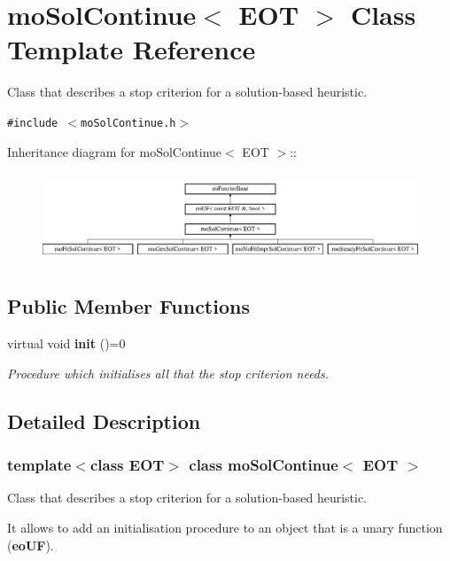 \section{mo\-Sol\-Continue$<$ EOT $>$ Class Template Reference}
\label{classmo_sol_continue}
Class that describes a stop criterion for a solution-based heuristic.  


{\tt \#include $<$mo\-Sol\-Continue.h$>$}

Inheritance diagram for mo\-Sol\-Continue$<$ EOT $>$::\begin{figure}[H]
\begin{center}
\leavevmode
\includegraphics[height=2.70531cm]{classmo_sol_continue}
\end{center}
\end{figure}
\subsection*{Public Member Functions}
\begin{CompactItemize}
\item 
virtual void {\bf init} ()=0
\begin{CompactList}\small\item\em Procedure which initialises all that the stop criterion needs. \item\end{CompactList}\end{CompactItemize}


\subsection{Detailed Description}
\subsubsection*{template$<$class EOT$>$ class mo\-Sol\-Continue$<$ EOT $>$}

Class that describes a stop criterion for a solution-based heuristic. 

It allows to add an initialisation procedure to an object that is a unary function ({\bf eo\-UF}). 



